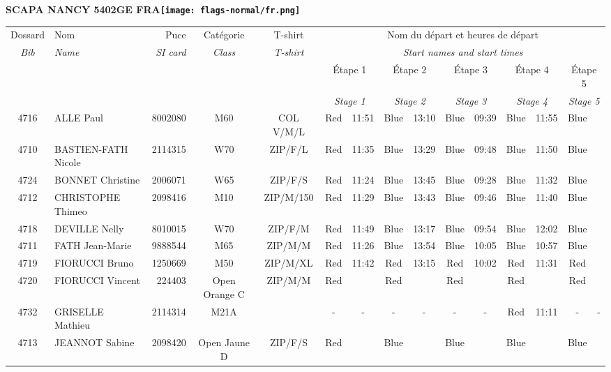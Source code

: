 \documentclass{report}
\begin{document}
\newpage
  \Huge \centering \bfseries SCAPA NANCY 5402GE FRA\normalfont \footnotesize \sffamily \hfill \texttt{[image: flags-normal/fr.png]} \newline 
  \begin{longtable}{|c|l|r|c|c|*{5}{cc|}}
    Dossard & Nom  & Puce    & Catégorie & T-shirt & \multicolumn{10}{c|}{Nom du départ et heures de départ} \\
    \itshape Bib     & \itshape Name & \itshape SI card & \itshape Class  & \itshape  T-shirt  & \multicolumn{10}{c|}{\itshape Start names and start times} \\
    \hline
    & & & & & \multicolumn{2}{c|}{Étape 1} & \multicolumn{2}{c|}{Étape 2} & \multicolumn{2}{c|}{Étape 3} & \multicolumn{2}{c|}{Étape 4} & \multicolumn{2}{c|}{Étape 5} \\
    & & & & & \multicolumn{2}{c|}{\itshape Stage 1} & \multicolumn{2}{c|}{\itshape Stage 2} & \multicolumn{2}{c|}{\itshape Stage 3} & \multicolumn{2}{c|}{\itshape Stage 4} & \multicolumn{2}{c|}{\itshape Stage 5} \\
    \hline
    4716 & ALLE Paul & 8002080 & M60 & COL V/M/L & Red & 11:51 & Blue & 13:10 & Blue & 09:39 & Blue & 11:55 & Blue &  \\
    4710 & BASTIEN-FATH Nicole & 2114315 & W70 & ZIP/F/L & Red & 11:35 & Blue & 13:29 & Blue & 09:48 & Blue & 11:50 & Blue &  \\
    4724 & BONNET Christine & 2006071 & W65 & ZIP/F/S & Red & 11:24 & Blue & 13:45 & Blue & 09:28 & Blue & 11:32 & Blue &  \\
    4712 & CHRISTOPHE Thimeo & 2098416 & M10 & ZIP/M/150 & Red & 11:29 & Blue & 13:43 & Blue & 09:46 & Blue & 11:40 & Blue &  \\
    4718 & DEVILLE Nelly & 8010015 & W70 & ZIP/F/M & Red & 11:49 & Blue & 13:17 & Blue & 09:54 & Blue & 12:02 & Blue &  \\
    4711 & FATH Jean-Marie & 9888544 & M65 & ZIP/M/M & Red & 11:26 & Blue & 13:54 & Blue & 10:05 & Blue & 10:57 & Blue &  \\
    4719 & FIORUCCI Bruno & 1250669 & M50 & ZIP/M/XL & Red & 11:42 & Red & 13:15 & Red & 10:02 & Red & 11:31 & Red &  \\
    4720 & FIORUCCI Vincent & 224403 & Open Orange C & ZIP/M/M & Red &   & Red &   & Red &   & Red &   & Red &  \\
    4732 & GRISELLE Mathieu & 2114314 & M21A &   & - &  - & - &  - & - &  - & Red & 11:11 & - &  -\\
    4713 & JEANNOT Sabine & 2098420 & Open Jaune D & ZIP/F/S & Red &   & Blue &   & Blue &   & Blue &   & Blue &  \\

\end{longtable}
\end{document}
